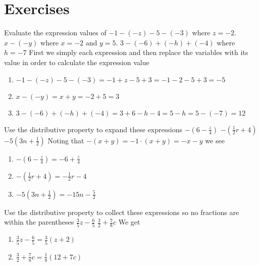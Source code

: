 \section{Exercises}\label{alg:exercises}


\begin{ExerciseList}

\Exercise Evaluate the expression values of
\Question $-1 - (-z) - 5 - (-3)$ where $z = -2$.
\Question $x - (-y)$ where $x = -2$ and $y = 5$.
\Question $3 - (-6) + (-h) + (-4)$ where $h = -7$
\Answer First we simply each expression and then replace the variables with its value in  order to calculate the expression value
\begin{enumerate}
\item \myindent $-1 - (-z) - 5 - (-3) = -1 + z - 5 + 3 = -1 - 2 - 5 + 3 = -5$
\item \myindent $x - (-y) = x + y = -2 + 5 = 3$
\item \myindent $3 - (-6) + (-h) + (-4) = 3 + 6 - h - 4 = 5 - h = 5 - (-7) = 12$
\end{enumerate}

\Exercise Use the distributive property to expand these expressions
\Question $-(6 - \frac{z}{4})$
\Question $-(\frac{1}{2}r + 4)$
\Question $-5(3n + \frac{1}{2})$
\Answer Noting that $-(x + y) = -1 \cdot (x+y) = -x - y$ we see
\begin{enumerate}
\item \myindent $-(6 - \frac{z}{4})   = -6 + \frac{z}{4}$
\item \myindent $-(\frac{1}{2}r + 4)  = -\frac{1}{2}r - 4$
\item \myindent $-5(3n + \frac{1}{2}) = -15n - \frac{5}{2}$
\end{enumerate}

\Exercise Use the distributive property to collect these expressions so
no fractions are within the parentheses
\Question $\frac{3}{5}z - \frac{6}{5}$
\Question $\frac{3}{2} + \frac{7}{8}c$
\Answer We get
\begin{enumerate}
\item \myindent $\frac{3}{5}z - \frac{6}{5} = \frac{3}{5}(z + 2)$
\item \myindent $\frac{3}{2} + \frac{7}{8}c = \frac{1}{8}(12 + 7c)$
\end{enumerate}


\end{ExerciseList}
